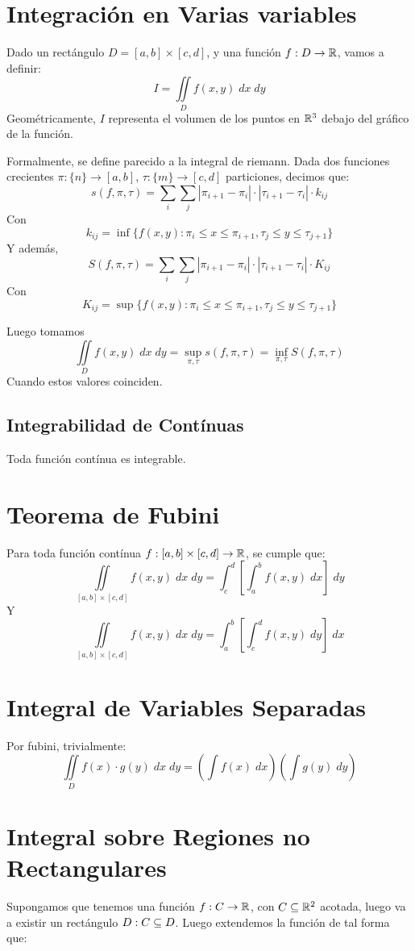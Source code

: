 \documentclass{article}
\begin{document}
\section*{Integración en Varias variables}
Dado un rectángulo $D = [a,b] \times [c,d]$, y una función $f : D \to \mathbb{R}$, vamos a definir:
\[I = \iint\limits_D f(x,y) \; dx \; dy\]
Geométricamente, $I$ representa el volumen de los puntos en $\mathbb{R}^3$ debajo del gráfico de la función.

Formalmente, se define parecido a la integral de riemann.
Dada dos funciones crecientes $\pi : \{n\} \to [a,b]$, $\tau : \{m\} \to [c,d]$ particiones, decimos que:
\[s(f,\pi,\tau) = \sum_i \sum_j |\pi_{i+1} - \pi_i| \cdot |\tau_{i+1} - \tau_i| \cdot k_{ij}\]
Con
\[k_{ij} = \inf \{f(x,y) : \pi_i \leq x \leq \pi_{i+1}, \tau_j \leq y \leq \tau_{j+1}\}\]
Y además,
\[S(f,\pi,\tau) = \sum_i \sum_j |\pi_{i+1} - \pi_i| \cdot |\tau_{i+1} - \tau_i| \cdot K_{ij}\]
Con
\[K_{ij} = \sup \{f(x,y) : \pi_i \leq x \leq \pi_{i+1}, \tau_j \leq y \leq \tau_{j+1}\}\]

Luego tomamos
\[\iint\limits_D f(x,y) \; dx \; dy = \sup_{\pi, \tau} s(f, \pi, \tau) = \inf_{\pi, \tau} S(f, \pi, \tau)\]
Cuando estos valores coinciden.

\subsection*{Integrabilidad de Contínuas}
Toda función contínua es integrable.

\section*{Teorema de Fubini}
Para toda función contínua $f : [a,b] \times [c, d] \to \mathbb{R}$, se cumple que:
\[
	\iint\limits_{[a,b] \times [c,d]} f(x,y) \; dx \; dy = \int_c^d \left[\int_a^b f(x,y) \; dx\right] \; dy
\]
Y
\[
	\iint\limits_{[a,b] \times [c,d]} f(x,y) \; dx \; dy = \int_a^b \left[\int_c^d f(x,y) \; dy\right] \; dx
\]

\section*{Integral de Variables Separadas}
Por fubini, trivialmente:
\[
	\iint\limits_D f(x) \cdot g(y) \; dx \; dy = \left(\int f(x) \; dx\right) \left(\int g(y) \; dy\right)
\]

\section*{Integral sobre Regiones no Rectangulares}
Supongamos que tenemos una función $f : C \to \mathbb{R}$, con $C \subseteq \mathbb{R}^2$ acotada, luego va a existir un rectángulo $D : C \subseteq D$. Luego extendemos la función de tal forma que:
\end{document}
